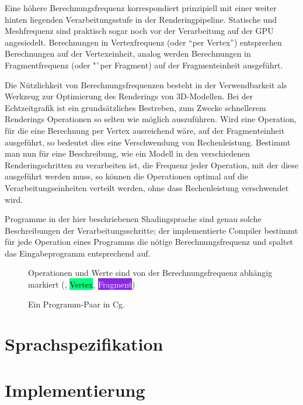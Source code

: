 \documentclass[twoside,a4paper,fleqn,12pt]{book}
\begin{document}
Eine höhere Berechnungsfrequenz korrespondiert prinzipiell mit einer weiter hinten liegenden Verarbeitungsstufe in der Renderingpipeline.
Statische und Meshfrequenz sind praktisch sogar noch vor der Verarbeitung auf der GPU angesiedelt. Berechnungen in Vertexfrequenz (oder "`per Vertex"')
entsprechen Berechnungen auf der Vertexeinheit, analog werden Berechnungen in Fragmentfrequenz (oder "`per Fragment) auf der Fragmenteinheit ausgeführt.

Die Nützlichkeit von Berechnungsfrequenzen besteht in der Verwendbarkeit als Werkzeug zur Optimierung des Renderings von 3D-Modellen.
Bei der Echtzeitgrafik ist ein grundsätzliches Bestreben, zum Zwecke schnellerem Renderings Operationen so selten wie möglich auszuführen.
Wird eine Operation, für die eine Berechnung per Vertex ausreichend wäre, auf der Fragmenteinheit ausgeführt, so bedeutet dies
eine Verschwendung von Rechenleistung. Bestimmt man nun für eine Beschreibung, wie ein Modell in den verschiedenen Renderingschritten zu
verarbeiten ist, die Frequenz jeder Operation, mit der diese ausgeführt werden muss, so können die Operationen optimal auf die
Verarbeitungseinheiten verteilt werden, ohne dass Rechenleistung verschwendet wird.

Programme in der hier beschriebenen Shadingsprache sind genau solche Beschreibungen der Verarbeitungsschritte; der implementierte Compiler
bestimmt für jede Operation eines Programms die nötige Berechnungsfrequenz und spaltet das Eingabeprogramm entsprechend auf.

\newcommand\freqPerMesh[1]{\framebox{#1}}
\newcommand\freqPerVert[1]{\colorbox{SpringGreen}{\textcolor{Black}{#1}}}
\newcommand\freqPerFrag[1]{\colorbox{BlueViolet}{\textcolor{White}{#1}}}
\begin{figure}[hp]
  
  \caption{Ein Programm-Paar in Cg.}
  \centering
  \small Operationen und Werte sind von der Berechnungsfrequenz abhängig markiert (\freqPerMesh{Mesh}, \freqPerVert{Vertex}, \freqPerFrag{Fragment})
  \label{fig:simple_cg}
\end{figure}

\newpage
\chapter{Sprachspezifikation}
\label{langspec}



\chapter{Implementierung}
\label{implementation}
\end{document}
